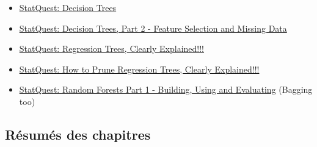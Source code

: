 \documentclass[12pt, titlepage, french]{report}
\begin{document}
\begin{YTB_vids}
\begin{itemize}
	\item	\href{https://www.youtube.com/watch?v=7VeUPuFGJHk&list=PLblh5JKOoLUICTaGLRoHQDuF_7q2GfuJF&index=34}{StatQuest: Decision Trees}
	\item	\href{https://www.youtube.com/watch?v=wpNl-JwwplA&list=PLblh5JKOoLUICTaGLRoHQDuF_7q2GfuJF&index=35}{StatQuest: Decision Trees, Part 2 - Feature Selection and Missing Data}
	\item	\href{https://www.youtube.com/watch?v=g9c66TUylZ4&list=PLblh5JKOoLUICTaGLRoHQDuF_7q2GfuJF&index=36}{StatQuest: Regression Trees, Clearly Explained!!!}
	\item	\href{https://www.youtube.com/watch?v=D0efHEJsfHo&list=PLblh5JKOoLUICTaGLRoHQDuF_7q2GfuJF&index=37}{StatQuest: How to Prune Regression Trees, Clearly Explained!!!}
	\item	\href{https://www.youtube.com/watch?v=J4Wdy0Wc_xQ}{StatQuest: Random Forests Part 1 - Building, Using and Evaluating} (Bagging too)
\end{itemize}
\end{YTB_vids}

\subsection{Résumés des chapitres}
\end{document}
